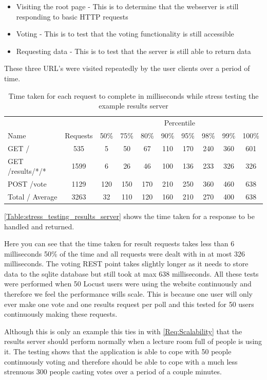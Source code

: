 \begin{itemize}
\item Visiting the root page - This is to determine that the webserver is still responding to basic HTTP requests
\item Voting - This is to test that the voting functionality is still accessible
\item Requesting data - This is to test that the server is still able to return data
\end{itemize}

These three URL's were visited repeatedly by the user clients over a period of time.

\begin{table}
\caption{Time taken for each request to complete in milliseconds while stress testing the example results server}
\begin{tabular}{l c  c c c c c c c c }
\hline 
& & \multicolumn{8}{c}{Percentile} \\
Name & Requests & 50\% & 75\% & 80\% & 90\% & 95\% & 98\% & 99\% & 100\% \\ 
\hline 
GET / & 535 & 5 & 50 & 67 & 110 & 170 & 240 & 360 & 601 \\ 
\hline 
GET /results/*/* & 1599 & 6 & 26 & 46 & 100 & 136 & 233 & 326 & 326 \\ 
\hline 
POST /vote & 1129 & 120 & 150 & 170 & 210 & 250 & 360 & 460 & 638 \\ 
\hline 
Total / Average & 3263 & 32 & 110 & 120 & 160 & 210 & 270 & 400 & 638 \\ 
\hline 
\end{tabular}
\label{Table:stress_testing_results_server}
\end{table}

\autoref{Table:stress_testing_results_server} shows the time taken for a response to be handled and returned.

Here you can see that the time taken for result requests takes less than 6 milliseconds 50\% of the time and all requests were dealt with in at most 326 milliseconds. The voting REST point takes slightly longer as it needs to store data to the sqlite database but still took at max 638 milliseconds. All these tests were performed when 50 Locust users were using the website continuously and therefore we feel the performance wills scale. This is because one user will only ever make one vote and one results request per poll and this tested for 50 users continuously making these requests.

Although this is only an example this ties in with \cref{Req:Scalability} that the results server should perform normally when a lecture room full of people is using it. The testing shows that the application is able to cope with 50 people continuously voting and therefore should be able to cope with a much less strenuous 300 people casting votes over a period of a couple minutes.

